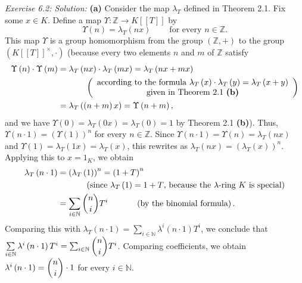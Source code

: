 \documentclass[numbers=enddot,12pt,final,onecolumn,notitlepage]{scrartcl}%
\begin{document}
\textit{Exercise 6.2: Solution:} \textbf{(a)} Consider the map $\lambda_{T}$
defined in Theorem 2.1. Fix some $x\in K$. Define a map $\Upsilon
:\mathbb{Z}\rightarrow K\left[  \left[  T\right]  \right]  $ by%
\[
\Upsilon\left(  n\right)  =\lambda_{T}\left(  nx\right)
\ \ \ \ \ \ \ \ \ \ \text{for every }n\in\mathbb{Z}\text{.}%
\]
This map $\Upsilon$ is a group homomorphism from the group $\left(
\mathbb{Z},+\right)  $ to the group $\left(  K\left[  \left[  T\right]
\right]  ^{\times},\cdot\right)  $ (because every two elements $n$ and $m$ of
$\mathbb{Z}$ satisfy
\begin{align*}
\Upsilon\left(  n\right)  \cdot\Upsilon\left(  m\right)   &  =\lambda
_{T}\left(  nx\right)  \cdot\lambda_{T}\left(  mx\right)  =\lambda_{T}\left(
nx+mx\right) \\
&  \ \ \ \ \ \ \ \ \ \ \left(
\begin{array}
[c]{c}%
\text{according to the formula }\lambda_{T}\left(  x\right)  \cdot\lambda
_{T}\left(  y\right)  =\lambda_{T}\left(  x+y\right) \\
\text{given in Theorem 2.1 \textbf{(b)}}%
\end{array}
\right) \\
&  =\lambda_{T}\left(  \left(  n+m\right)  x\right)  =\Upsilon\left(
n+m\right)  ,
\end{align*}
and we have $\Upsilon\left(  0\right)  =\lambda_{T}\left(  0x\right)
=\lambda_{T}\left(  0\right)  =1$ by Theorem 2.1 \textbf{(b)}). Thus,
$\Upsilon\left(  n\cdot1\right)  =\left(  \Upsilon\left(  1\right)  \right)
^{n}$ for every $n\in\mathbb{Z}$. Since $\Upsilon\left(  n\cdot1\right)
=\Upsilon\left(  n\right)  =\lambda_{T}\left(  nx\right)  $ and $\Upsilon
\left(  1\right)  =\lambda_{T}\left(  1x\right)  =\lambda_{T}\left(  x\right)
$, this rewrites as $\lambda_{T}\left(  nx\right)  =\left(  \lambda_{T}\left(
x\right)  \right)  ^{n}$. Applying this to $x=1_{K}$, we obtain%
\begin{align*}
\lambda_{T}\left(  n\cdot1\right)   &  =\left(  \lambda_{T}\left(  1\right)
\right)  ^{n}=\left(  1+T\right)  ^{n}\\
&  \ \ \ \ \ \ \ \ \ \ \left(  \text{since }\lambda_{T}\left(  1\right)
=1+T\text{, because the }\lambda\text{-ring }K\text{ is special}\right) \\
&  =\sum_{i\in\mathbb{N}}\dbinom{n}{i}T^{i}\ \ \ \ \ \ \ \ \ \ \left(
\text{by the binomial formula}\right)  .
\end{align*}
Comparing this with $\lambda_{T}\left(  n\cdot1\right)  =\sum\limits_{i\in
\mathbb{N}}\lambda^{i}\left(  n\cdot1\right)  T^{i}$, we conclude that
$\sum\limits_{i\in\mathbb{N}}\lambda^{i}\left(  n\cdot1\right)  T^{i}%
=\sum_{i\in\mathbb{N}}\dbinom{n}{i}T^{i}$. Comparing coefficients, we obtain
$\lambda^{i}\left(  n\cdot1\right)  =\dbinom{n}{i}\cdot1$ for every
$i\in\mathbb{N}$.
\end{document}
